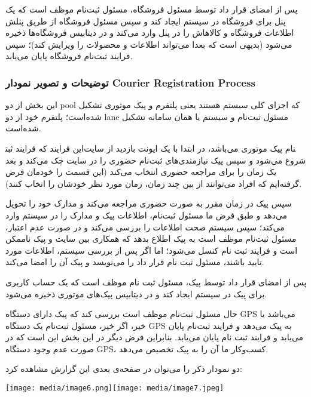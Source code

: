 \documentclass[]{article}
\begin{document}
پس از امضای قرار داد توسط مسئول فروشگاه، مسئول ثبت‌نام موظف است که یک
پنل برای فروشگاه در سیستم ایجاد کند و سپس مسئول فروشگاه از طریق پنلش
اطلاعات فروشگاه‌ و کالاهاش را در پنل وارد می‌کند و در دیتابیس فروشگاه‌ها
ذخیره می‌شود (بدیهی است که بعدا می‌تواند اطلاعات و محصولات را ویرایش
کند)؛ سپس فرایند ثبت‌نام فروشگاه پایان می‌یابد.

\subsubsection{توضیحات و تصویر نمودار Courier Registration
Process}\label{ux62aux648ux636ux6ccux62dux627ux62a-ux648-ux62aux635ux648ux6ccux631-ux646ux645ux648ux62fux627ux631-courier-registration-process}

این بخش از دو pool که اجزای کلی سیستم هستند یعنی پلتفرم و پیک موتوری
تشکیل شده‌است؛ پلتفرم خود از دو lane مسئول ثبت‌نام و سیستم یا همان
سامانه تشکیل شده‌است.

این فرایند که فرایند ثبت‎نام پیک موتوری می‌باشد، در ابتدا با یک ایونت
بازدید از سایت شروع می‌شود و سپس پیک نیازمندی‌های ثبت‌نام حضوری را در
سایت چک می‌کند و بعد یک زمان را برای مراجعه حضوری انتخاب می‌کند (این
قسمت را خودمان فرض گرفته‌ایم که افراد می‌توانند از بین چند زمان، زمان
مورد نظر خودشان را اتخاب کنند).

سپس پیک در زمان مقرر به صورت حضوری مراجعه می‌کند و مدارک خود را تحویل
می‌دهد و طبق فرض ما مسئول ثبت‌نام، اطلاعات پیک و مدارک را در سیستم وارد
می‌کند؛ سپس سیستم صحت اطلاعات را بررسی می‌کند و در صورت عدم اعتبار،
مسئول ثبت‌نام موظف است به پیک اطلاع بدهد که همکاری بین سایت و پیک ناممکن
است و فرایند ثبت نام کنسل می‌شود؛ اما اگر پس از بررسی سیستم، اطلاعات
مورد تایید باشند، مسئول ثبت نام قرار داد را می‌نویسد و پیک آن را امضا
می‌کند.

پس از امضای قرار داد توسط پیک، مسئول ثبت نام موظف است که یک حساب کاربری
برای پیک در سیستم ایجاد کند و در دیتابیس پیک‌های موتوری ذخیره می‌شود.

حال مسئول ثبت‌نام موظف است بررسی کند که پیک دارای دستگاه GPS می‌باشد یا
خیر، اگر خیر، مسئول ثبت‌نام یک دستگاه GPS به پیک می‌دهد و فرایند ثبت‌نام
پایان می‌یابد و فرایند ثبت نام پایان می‌یابد. بنابراین فرض دیگر در این
بخش این است که در صورت عدم وجود دستگاه GPS، کسب‌وکار ما آن را به پیک
تخصیص می‌دهد.

دو نمودار ذکر را می‌توان در صفحه‌ی بعدی این گزارش مشاهده کرد:

\texttt{[image: media/image6.png]}\texttt{[image: media/image7.jpeg]}
\end{document}
